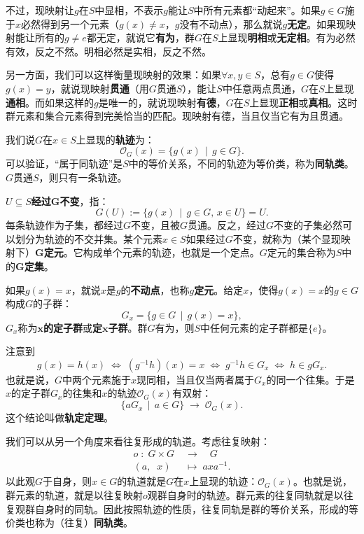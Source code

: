 \documentclass[12pt,UTF8,fontset=none]{ctexbook}
\begin{document}
不过，现映射让$g$在$S$中显相，不表示$g$能让$S$中所有元素都“动起来”。如果$g\in G$施于$x$必然得到另一个元素（$g(x)\neq x$，$g$没有不动点），那么就说$g$\textbf{无定}。如果现映射能让所有的$g\neq e$都无定，就说它\textbf{有为}，群$G$在$S$上显现\textbf{明相}或\textbf{无定相}。有为必然有效，反之不然。明相必然是实相，反之不然。

另一方面，我们可以这样衡量现映射的效果：如果$\forall x, y \in S$，总有$g\in G$使得$g(x) = y$，就说现映射\textbf{贯通}（用$G$贯通$S$），能让$S$中任意两点贯通，$G$在$S$上显现\textbf{通相}。而如果这样的$g$是唯一的，就说现映射\textbf{有德}，$G$在$S$上显现\textbf{正相}或\textbf{真相}。这时群元素和集合元素得到完美恰当的匹配。现映射有德，当且仅当它有为且贯通。

我们说$G$在$x\in S$上显现的\textbf{轨迹}为：
$$ \mathcal{O}_G(x) = \{g(x) \, \mid \, g\in G\}.$$
可以验证，“属于同轨迹”是$S$中的等价关系，不同的轨迹为等价类，称为\textbf{同轨类}。$G$贯通$S$，则只有一条轨迹。

$U\subseteq S$\textbf{经过}$\boldsymbol{G}$\textbf{不变}，指：
$$ G(U) := \{g(x) \, \mid \, g\in G,\, x\in U\} = U. $$
每条轨迹作为子集，都经过$G$不变，且被$G$贯通。反之，经过$G$不变的子集必然可以划分为轨迹的不交并集。某个元素$x\in S$如果经过$G$不变，就称为（某个显现映射下）$\boldsymbol{G}$\textbf{定元}。它构成单个元素的轨迹，也就是一个定点。$G$定元的集合称为$S$中的$\boldsymbol{G}$\textbf{定集}。

如果$g(x) = x$，就说$x$是$g$的\textbf{不动点}，也称$g$\textbf{定元}。给定$x$，使得$g(x) = x$的$g\in G$构成$G$的子群：
$$ G_x = \{g\in G \, \mid \, g(x)= x\}, $$
$G_x$称为$\boldsymbol{x}$\textbf{的定子群}或\textbf{定}$\boldsymbol{x}$\textbf{子群}。群$G$有为，则$S$中任何元素的定子群都是$\{e\}$。

注意到
$$ g(x) = h(x) \; \Leftrightarrow \; \left(g^{-1}h\right) (x) = x \; \Leftrightarrow \; g^{-1}h \in G_x \; \Leftrightarrow \; h \in gG_x. $$
也就是说，$G$中两个元素施于$x$现同相，当且仅当两者属于$G_x$的同一个往集。于是$x$的定子群$G_x$的往集和$x$的轨迹$\mathcal{O}_G(x)$有双射：
$$ \{aG_x\,\mid\,a\in G\}\; \longrightarrow \; \mathcal{O}_G(x). $$
这个结论叫做\textbf{轨定定理}。

\begin{et}
    我们可以从另一个角度来看往复形成的轨道。考虑往复映射：
    \begin{align*}
        \mathit{o} \; : \; G \times G \; &\longrightarrow \quad G \\
        (a,\;\;x) \;&\longmapsto \; axa^{-1}.
    \end{align*}
    以此观$G$于自身，则$x\in G$的轨道就是$G$在$x$上显现的轨迹：$\mathcal{O}_G(x)$。也就是说，
    群元素的轨道，就是以往复映射$\mathit{o}$观群自身时的轨迹。群元素的往复同轨就是以往复观群自身时的同轨。因此按照轨迹的性质，往复同轨是群的等价关系，形成的等价类也称为（往复）\textbf{同轨类}。
\end{et}
\end{document}
